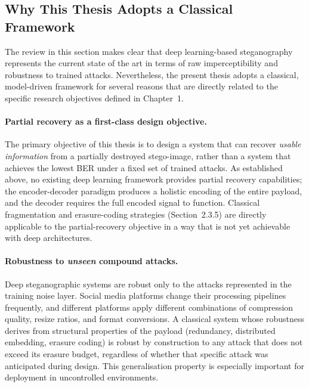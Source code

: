 \documentclass[12pt,a4paper,oneside]{report}
\begin{document}
	\subsection{Why This Thesis Adopts a Classical Framework}
	\label{subsec:justification}
	
	The review in this section makes clear that deep learning-based steganography represents the
	current state of the art in terms of raw imperceptibility and robustness to trained attacks.
	Nevertheless, the present thesis adopts a classical, model-driven framework for several reasons
	that are directly related to the specific research objectives defined in Chapter~1.
	
	\paragraph{Partial recovery as a first-class design objective.}
	The primary objective of this thesis is to design a system that can recover \emph{usable
		information} from a partially destroyed stego-image, rather than a system that achieves the
	lowest BER under a fixed set of trained attacks. As established above, no existing deep learning
	framework provides partial recovery capabilities; the encoder-decoder paradigm produces a
	holistic encoding of the entire payload, and the decoder requires the full encoded signal to
	function. Classical fragmentation and erasure-coding strategies (Section~2.3.5) are directly
	applicable to the partial-recovery objective in a way that is not yet achievable with deep
	architectures.
	
	\paragraph{Robustness to \emph{unseen} compound attacks.}
	Deep steganographic systems are robust only to the attacks represented in the training noise layer.
	Social media platforms change their processing pipelines frequently, and different platforms apply
	different combinations of compression quality, resize ratios, and format conversions. A classical
	system whose robustness derives from structural properties of the payload (redundancy, distributed
	embedding, erasure coding) is robust by construction to any attack that does not exceed its
	erasure budget, regardless of whether that specific attack was anticipated during design. This
	generalisation property is especially important for deployment in uncontrolled environments.
	
\end{document}
